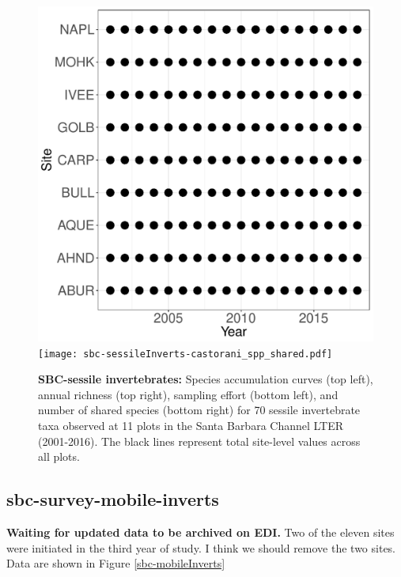 \documentclass[11pt, oneside]{article}
\begin{document}
\begin{figure}[h!]
\includegraphics[scale = 0.4]{sbc-sessileInverts-castorani_spatiotemporal_sampling_effort.pdf}
\texttt{[image: sbc-sessileInverts-castorani\_spp\_shared.pdf]}
\caption{{\bf SBC-sessile invertebrates:} Species accumulation curves (top left),  annual richness (top right), sampling effort (bottom left), and number of shared species (bottom right)  for 70 sessile invertebrate taxa observed at 11 plots in the Santa Barbara Channel LTER (2001-2016). The black lines represent total site-level values across all plots.}
\label{sbc-sessileInverts}
\end{figure}

\subsection {sbc-survey-mobile-inverts}
{\bf Waiting for updated data to be archived on EDI.}
Two of the eleven sites were initiated in the third year of study.
I think we should remove the two sites.
Data are shown in Figure \ref{sbc-mobileInverts}
\end{document}
